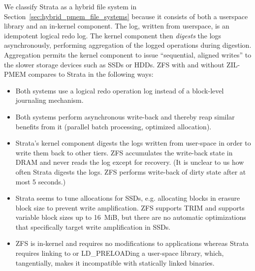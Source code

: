\documentclass[12pt,a4paper,twoside,draft]{book}
\begin{document}
We classify Strata as a hybrid file system in Section~\ref{sec:hybrid_pmem_file_systems} because it consists of both a userspace library and an in-kernel component.
The log, written from userspace, is an idempotent logical redo log.
The kernel component then \textit{digests} the logs asynchronously, performing aggregation of the logged operations during digestion.
Aggregation permits the kernel component to issue “sequential, aligned writes” to the slower storage devices such as SSDs or HDDs.
ZFS with and without ZIL-PMEM compares to Strata in the following ways:
\begin{itemize}
    \item Both systems use a logical redo operation log instead of a block-level journaling mechanism.
    \item Both systems perform asynchronous write-back and thereby reap similar benefits from it (parallel batch processing, optimized allocation).
    \item Strata’s kernel component digests the logs written from user-space in order to write them back to other tiers.
          ZFS accumulates the write-back state in DRAM and never reads the log except for recovery.
          (It is unclear to us how often Strata digests the logs. ZFS performs write-back of dirty state after at most 5 seconds.)
    \item Strata seems to tune allocations for SSDs, e.g. allocating blocks in erasure block size to prevent write amplification.
          ZFS supports TRIM and supports variable block sizes up to \SI{16}{MiB}, but there are no automatic optimizations that specifically target write amplification in SSDs.
    \item ZFS is in-kernel and requires no modifications to applications whereas Strata requires linking to or LD\_PRELOADing a user-space library, which, tangentially, makes it incompatible with statically linked binaries.
\end{itemize}
\end{document}
